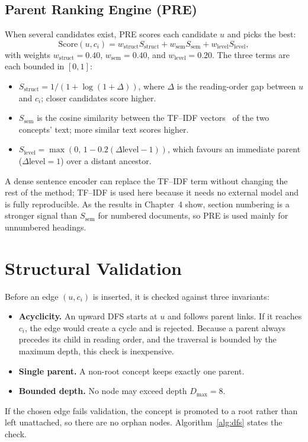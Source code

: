 \documentclass[12pt,a4paper,twoside,openright]{report}
\begin{document}
\subsection{Parent Ranking Engine (PRE)}
When several candidates exist, PRE scores each candidate $u$ and picks the best:
\begin{equation}
\text{Score}(u,c_i)=w_{\text{struct}}S_{\text{struct}}+w_{\text{sem}}S_{\text{sem}}+w_{\text{level}}S_{\text{level}},
\label{eq:pre}
\end{equation}
with weights $w_{\text{struct}}=0.40$, $w_{\text{sem}}=0.40$, and $w_{\text{level}}=0.20$.
The three terms are each bounded in $[0,1]$:
\begin{itemize}
  \item $S_{\text{struct}}=1/(1+\log(1+\Delta))$, where $\Delta$ is the reading-order
  gap between $u$ and $c_i$; closer candidates score higher.
  \item $S_{\text{sem}}$ is the cosine similarity between the TF--IDF
  vectors~\cite{salton1983introduction} of the two concepts' text; more similar text
  scores higher.
  \item $S_{\text{level}}=\max(0,\,1-0.2(\Delta\mathrm{level}-1))$, which favours an
  immediate parent ($\Delta\mathrm{level}=1$) over a distant ancestor.
\end{itemize}
A dense sentence encoder can replace the TF--IDF term without changing the rest of the
method; TF--IDF is used here because it needs no external model and is fully
reproducible. As the results in Chapter~4 show, section numbering is a stronger signal
than $S_{\text{sem}}$ for numbered documents, so PRE is used mainly for unnumbered
headings.

\section{Structural Validation}
\label{sec:invariants}
Before an edge $(u,c_i)$ is inserted, it is checked against three invariants:
\begin{itemize}
  \item \textbf{Acyclicity.} An upward DFS starts at $u$ and follows parent links. If it
  reaches $c_i$, the edge would create a cycle and is rejected. Because a parent always
  precedes its child in reading order, and the traversal is bounded by the maximum depth,
  this check is inexpensive.
  \item \textbf{Single parent.} A non-root concept keeps exactly one parent.
  \item \textbf{Bounded depth.} No node may exceed depth $D_{\max}=8$.
\end{itemize}
If the chosen edge fails validation, the concept is promoted to a root rather than left
unattached, so there are no orphan nodes. Algorithm~\ref{alg:dfs} states the check.
\end{document}
